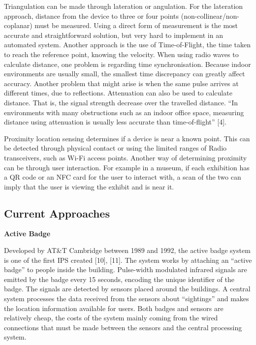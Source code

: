 Triangulation can be made through lateration or angulation. For the lateration approach, distance from the device to three or four points (non-collinear/non-coplanar) must be measured. Using a direct form of measurement is the most accurate and straightforward solution, but very hard to implement in an automated system. Another approach is the use of Time-of-Flight, the time taken to reach the reference point, knowing the velocity. When using radio waves to calculate distance, one problem is regarding time synchronisation. Because indoor environments are usually small, the smallest time discrepancy can greatly affect accuracy. Another problem that might arise is when the same pulse arrives at different times, due to reflections. Attenuation can also be used to calculate distance. That is, the signal strength decrease over the travelled distance. “In environments with many obstructions such as an indoor office space, measuring distance using attenuation is usually less accurate than time-of-flight” [4].

Proximity location sensing determines if a device is near a known point. This can be detected through physical contact or using the limited ranges of Radio transceivers, such as Wi-Fi access points. Another way of determining proximity can be through user interaction. For example in a museum, if each exhibition has a QR code or an NFC card for the user to interact with, a scan of the two can imply that the user is viewing the exhibit and is near it.
\subsection{Current Approaches}

\noindent \textbf{Active Badge}

Developed by AT\&T Cambridge between 1989 and 1992, the active badge system is one of the first IPS created [10], [11]. The system works by attaching an “active badge” to people inside the building. Pulse-width modulated infrared signals are emitted by the badge every 15 seconds, encoding the unique identifier of the badge. The signals are detected by sensors placed around the buildings. A central system processes the data received from the sensors about “sightings” and makes the location information available for users. Both badges and sensors are relatively cheap, the costs of the system mainly coming from the wired connections that must be made between the sensors and the central processing system. 

